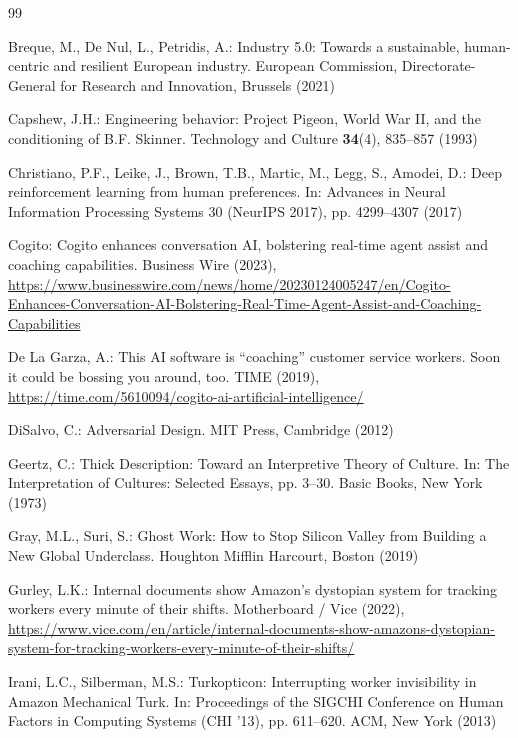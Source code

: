 \documentclass[11pt, a4paper]{article}
\begin{document}
\begin{thebibliography}{99}

Breque, M., De Nul, L., Petridis, A.: Industry 5.0: Towards a sustainable, human-centric and resilient European industry. European Commission, Directorate-General for Research and Innovation, Brussels (2021)

Capshew, J.H.: Engineering behavior: Project Pigeon, World War II, and the conditioning of B.F. Skinner. Technology and Culture \textbf{34}(4), 835--857 (1993)

Christiano, P.F., Leike, J., Brown, T.B., Martic, M., Legg, S., Amodei, D.: Deep reinforcement learning from human preferences. In: Advances in Neural Information Processing Systems 30 (NeurIPS 2017), pp. 4299--4307 (2017)

Cogito: Cogito enhances conversation AI, bolstering real-time agent assist and coaching capabilities. Business Wire (2023), \url{https://www.businesswire.com/news/home/20230124005247/en/Cogito-Enhances-Conversation-AI-Bolstering-Real-Time-Agent-Assist-and-Coaching-Capabilities}

De La Garza, A.: This AI software is ``coaching'' customer service workers. Soon it could be bossing you around, too. TIME (2019), \url{https://time.com/5610094/cogito-ai-artificial-intelligence/}

DiSalvo, C.: Adversarial Design. MIT Press, Cambridge (2012)

Geertz, C.: Thick Description: Toward an Interpretive Theory of Culture. In: The Interpretation of Cultures: Selected Essays, pp. 3--30. Basic Books, New York (1973)

Gray, M.L., Suri, S.: Ghost Work: How to Stop Silicon Valley from Building a New Global Underclass. Houghton Mifflin Harcourt, Boston (2019)

Gurley, L.K.: Internal documents show Amazon's dystopian system for tracking workers every minute of their shifts. Motherboard / Vice (2022), \url{https://www.vice.com/en/article/internal-documents-show-amazons-dystopian-system-for-tracking-workers-every-minute-of-their-shifts/}

Irani, L.C., Silberman, M.S.: Turkopticon: Interrupting worker invisibility in Amazon Mechanical Turk. In: Proceedings of the SIGCHI Conference on Human Factors in Computing Systems (CHI '13), pp. 611--620. ACM, New York (2013)


\end{thebibliography}
\end{document}

